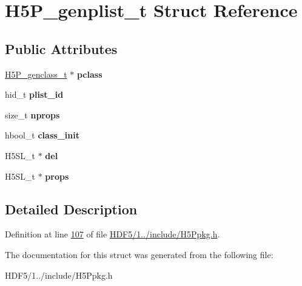 \hypertarget{struct_h5_p__genplist__t}{}\section{H5\+P\+\_\+genplist\+\_\+t Struct Reference}
\label{struct_h5_p__genplist__t}
\subsection*{Public Attributes}
\begin{DoxyCompactItemize}
\item 
\mbox{\label{struct_h5_p__genplist__t_ab6b3e33b817e1c724d812c25426f06b0}} 
\hyperlink{struct_h5_p__genclass__t}{H5\+P\+\_\+genclass\+\_\+t} $\ast$ {\bfseries pclass}
\item 
\mbox{\label{struct_h5_p__genplist__t_a08cdbd68a36b03a924b229c8bd25c9bb}} 
hid\+\_\+t {\bfseries plist\+\_\+id}
\item 
\mbox{\label{struct_h5_p__genplist__t_a8f5628dc65d9981caa46f9dc5cf13e3e}} 
size\+\_\+t {\bfseries nprops}
\item 
\mbox{\label{struct_h5_p__genplist__t_ae38045512c6df0d17f487b8f7fc6ad54}} 
hbool\+\_\+t {\bfseries class\+\_\+init}
\item 
\mbox{\label{struct_h5_p__genplist__t_aaed7276953212b27cd498d76e305f183}} 
H5\+S\+L\+\_\+t $\ast$ {\bfseries del}
\item 
\mbox{\label{struct_h5_p__genplist__t_ab40ee95957daa757f62edb1d7af64521}} 
H5\+S\+L\+\_\+t $\ast$ {\bfseries props}
\end{DoxyCompactItemize}


\subsection{Detailed Description}


Definition at line \hyperlink{_h_d_f5_21_810_81_2include_2_h5_ppkg_8h_source_l00107}{107} of file \hyperlink{_h_d_f5_21_810_81_2include_2_h5_ppkg_8h_source}{H\+D\+F5/1../include/\+H5\+Ppkg.\+h}.



The documentation for this struct was generated from the following file\+:\begin{DoxyCompactItemize}
\item 
H\+D\+F5/1../include/\+H5\+Ppkg.\+h\end{DoxyCompactItemize}
